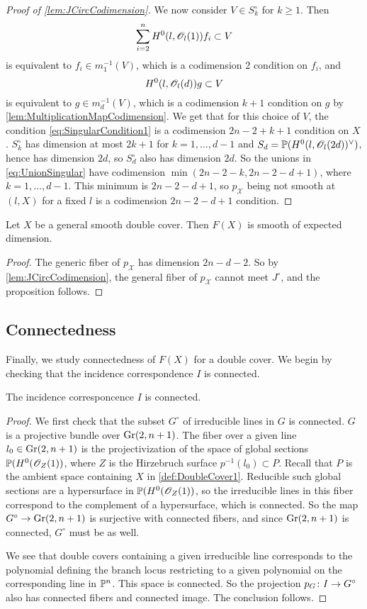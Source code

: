 \begin{proof}[Proof of \cref{lem:JCircCodimension}]
We now consider $V \in S_k^\circ$ for $k \geq 1$. Then
\[\sum_{i=2}^nH^0(l,\sO_l(1))f_i \subset V \]
is equivalent to $f_i \in m_1^{-1}(V)$, which is a codimension 2 condition on $f_i$, and 
\[H^0(l,\sO_l(d))g \subset V \]
is equivalent to $g \in m_d^{-1}(V)$, which is a codimension $k+1$ condition on $g$ by \cref{lem:MultiplicationMapCodimension}. We get that for this choice of $V$, the condition
\eqref{eq:SingularCondition1} is a codimension $2n-2+k+1$ condition on $X$.
 $S_k^\circ$ has dimension at most $2k+1$ for $k=1,\dots,d-1$ and $S_d = \P(H^0(l,\sO_l(2d))^\vee)$, hence has dimension $2d$, so $S_d^\circ$ also has dimension $2d$. So the unions in \eqref{eq:UnionSingular} have codimension $\min(2n-2-k,2n-2-d+1)$, where $k = 1,\dots,d-1$. This minimum is $2n-2-d+1$, so $p_{\mathscr{X}}$ being not smooth at $(l,X)$ for a fixed $l$ is a codimension $2n-2-d+1$ condition.
\end{proof}

\begin{proposition}
\label{prop:SmoothnessOfFanoVariety}
  Let $X$ be a general smooth double cover. Then $F(X)$ is smooth of expected dimension.
\end{proposition}
\begin{proof}
  The generic fiber of $p_{\mathcal{X}}$ has dimension $2n-d-2$. So by \cref{lem:JCircCodimension}, the general fiber of $p_{\mathscr{X}}$ cannot meet $J^\circ$, and the proposition follows.
\end{proof}

\subsection{Connectedness}
Finally, we study connectedness of $F(X)$ for a double cover. We begin by checking that the incidence correspondence $I$ is connected.
 \begin{lemma}
   \label{lem:IConnected}
 	The incidence corresponcence $I$ is connected.
 \end{lemma}
 \begin{proof}
   We first check that the subset $G^\circ$ of irreducible lines in $G$ is connected. $G$ is a projective bundle over $\Gr(2,n+1)$. The fiber over a given line ${l_0 \in \Gr(2,n+1)}$ is the 
projectivization of the space of global sections $\P(H^0(\sO_Z(1))$, where $Z$ is the Hirzebruch surface $p^{-1}(l_0) \subset P$. Recall that $P$ is the ambient space containing $X$ in \cref{def:DoubleCover1}. Reducible such global sections are a hypersurface in $\P(H^0(\sO_Z(1))$, so the irreducible lines in this fiber correspond to the complement of a hypersurface, which is connected. So the map $G^\circ \to \Gr(2,n+1)$ is surjective with connected fibers, and since $\Gr(2,n+1)$ is connected, $G^\circ$ must be as well.

We see that double covers containing a given irreducible line corresponds to the polynomial defining the branch locus restricting to a given polynomial on the corresponding line in $\P^n$. This space is connected. So the projection $p_G \from I \to G^\circ$ also has connected fibers and connected image. The conclusion follows.
 \end{proof}


